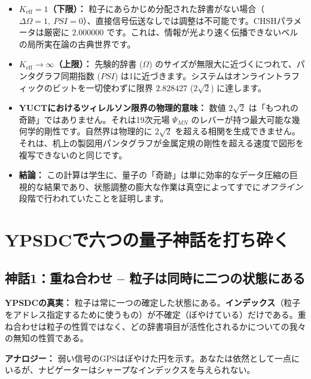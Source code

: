 \documentclass[12pt,a4paper]{article}
\begin{document}
	\begin{itemize}
		\item \textbf{\(K_{\mathrm{eff}} = 1\)（下限）：}  
		粒子にあらかじめ分配された辞書がない場合（\(\Delta\Omega = 1,\ PSI = 0\)）、直接信号伝送なしでは調整は不可能です。CHSHパラメータは厳密に \(2.000000\) です。これは、情報が光より速く伝播できないベルの局所実在論の古典世界です。
		
		\item \textbf{\(K_{\mathrm{eff}} \to \infty\)（上限）：}  
		先験的辞書 (\(\Omega\)) のサイズが無限大に近づくにつれて、パンタグラフ同期指数 (\(PSI\)) は1に近づきます。システムはオンライントラフィックのビットを一切使わずに限界 \(2.828427\) (\(2\sqrt{2}\)) に達します。
		
		\item \textbf{YUCTにおけるツィレルソン限界の物理的意味：}  
		数値 \(2\sqrt{2}\) は「もつれの奇跡」ではありません。それは19次元場 \(\Psi_{MN}\) のレバーが持つ最大可能な幾何学的剛性です。自然界は物理的に \(2\sqrt{2}\) を超える相関を生成できません。それは、机上の製図用パンタグラフが金属定規の剛性を超える速度で図形を複写できないのと同じです。
		
		\item \textbf{結論：}  
		この計算は学生に、量子の「奇跡」は単に効率的なデータ圧縮の巨視的な結果であり、状態調整の膨大な作業は真空によってすでに\textit{オフライン}段階で行われていたことを証明します。
	\end{itemize}
	
	
	\section{YPSDCで六つの量子神話を打ち砕く}
	
	\subsection{神話1：重ね合わせ -- 粒子は同時に二つの状態にある}
	\textbf{YPSDCの真実：} 粒子は常に一つの確定した状態にある。\textbf{インデックス}（粒子をアドレス指定するために使うもの）が不確定（ぼやけている）だけである。重ね合わせは粒子の性質ではなく、どの辞書項目が活性化されるかについての我々の無知の性質である。
	\par
	\textbf{アナロジー：} 弱い信号のGPSはぼやけた円を示す。あなたは依然として一点にいるが、ナビゲーターはシャープなインデックスを与えられない。
	
\end{document}
